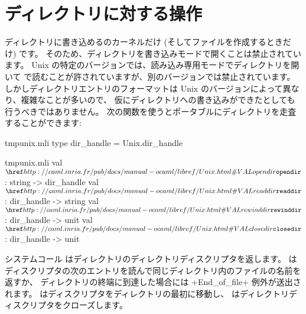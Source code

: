 \section{ディレクトリに対する操作}

ディレクトリに書き込めるのカーネルだけ (そしてファイルを作成するときだけ) です。
そのため、ディレクトリを書き込みモードで開くことは禁止されています。
Unix の特定のバージョンでは、読み込み専用モードでディレクトリを開いて 
で読むことが許されていますが、別のバージョンでは禁止されています。
しかしディレクトリエントリのフォーマットは Unix のバージョンによって異なり、複雑なことが多いので、
仮にディレクトリへの書き込みができたとしても行うべきではありません。
次の関数を使うとポータブルにディレクトリを走査することができます:
%
\begin{codefile}{tmpunix.mli}
type dir_handle = Unix.dir_handle
\end{codefile}
%
\begin{listingcodefile}{tmpunix.mli}
val $\libvalue{Unix}{opendir}$   : string -> dir_handle
val $\libvalue{Unix}{readdir}$   : dir_handle -> string
val $\libvalue{Unix}{rewinddir}$ : dir_handle -> unit
val $\libvalue{Unix}{closedir}$  : dir_handle -> unit
\end{listingcodefile}
%
システムコール  はディレクトリのディレクトリディスクリプタを返します。
 はディスクリプタの次のエントリを読んで同じディレクトリ内のファイルの名前を返すか、
ディレクトリの終端に到達した場合には \ml+End_of_file+ 例外が送出されます。
 はディスクリプタをディレクトリの最初に移動し、
 はディレクトリディスクリプタをクローズします。
